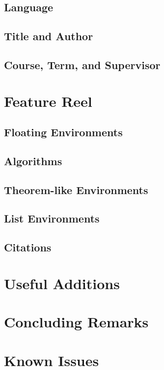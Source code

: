 \documentclass[logo]{mlai-report}
\begin{document}
	\subsection{Language} 
	
	\subsection{Title and Author}
	
	\subsection{Course, Term, and Supervisor} 
	
	\section{Feature Reel} 
	
	\subsection{Floating Environments} 
	
	\subsection{Algorithms}
	
	\subsection{Theorem-like Environments} 
	
	\subsection{List Environments} 
	
	\subsection{Citations} 
	
	\section{Useful Additions} 
	
	\section{Concluding Remarks}
	
	\printbibliography
	
	\appendix
	
	\section{Known Issues} 
\end{document}
